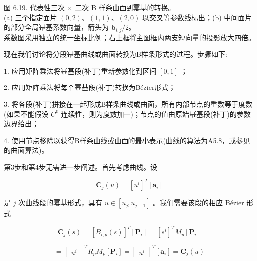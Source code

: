 \documentclass[../main.tex]{subfiles}
\begin{document}
\begin{center}
\begin{minipage}{28cm}
\vspace*{.6\baselineskip}
\centering
\begin{minipage}{13.6cm}\centering
{}
\end{minipage}\hfill
\begin{minipage}{13.6cm}\centering
{}
\end{minipage}
\par\smallskip
图 6.19. 代表性三次 $\times$ 二次 B 样条曲面到幂基的转换。\\
(a) 三个指定面片 $(0,2)$、$(1,1)$、$(2,0)$ 以交叉等参数线标出；(b) 中间面片的部分全局幂基系数向量，箭头为 $\mathbf b_{i,j}/2$。\\
系数图采用独立的统一坐标比例；右上框将主图框内两支短向量的投影放大四倍。
\end{minipage}
\end{center}

现在我们讨论将分段幂基曲线或曲面转换为B样条形式的过程。步骤如下:

1. 应用矩阵乘法将幂基段(补丁)重新参数化到区间 \(\left\lbrack  {0,1}\right\rbrack\) ；



2. 应用矩阵乘法将每个幂基段(补丁)转换为Bézier形式；

3. 将各段(补丁)拼接在一起形成B样条曲线或曲面，所有内部节点的重数等于度数(如果不能假设 \({C}^{0}\) 连续性，则为度数加一)；节点的值由原始幂基段(补丁)的参数边界给出；

4. 使用节点移除以获得B样条曲线或曲面的最小表示(曲线的算法为A5.8，或参见\cite{Till92}的曲面算法)。

第3步和第4步无需进一步阐述。首先考虑曲线。设

\[
{\mathbf{C}}_{j}\left( u\right)  = {\left\lbrack  {u}^{i}\right\rbrack  }^{T}\left\lbrack  {\mathbf{a}}_{i}\right\rbrack   \tag{6.92}
\]

是 \(j\) 次曲线段的幂基形式，具有 \(u \in  \left\lbrack  {{u}_{j},{u}_{j + 1}}\right\rbrack\) 。我们需要该段的相应 Bézier 形式

\[
{\mathbf{C}}_{j}\left( s\right)  = {\left\lbrack  {B}_{i,p}\left( s\right) \right\rbrack  }^{T}\left\lbrack  {\mathbf{P}}_{i}\right\rbrack   = {\left\lbrack  {s}^{i}\right\rbrack  }^{T}{M}_{p}\left\lbrack  {\mathbf{P}}_{i}\right\rbrack
\]

\[
= {\left\lbrack  \begin{array}{l} {u}^{i} \end{array}\right\rbrack  }^{T}{R}_{p}{M}_{p}\left\lbrack  {\mathbf{P}}_{i}\right\rbrack   = {\left\lbrack  \begin{array}{l} {u}^{i} \end{array}\right\rbrack  }^{T}\left\lbrack  {\mathbf{a}}_{i}\right\rbrack   = {\mathbf{C}}_{j}\left( u\right)
\]
\end{document}
